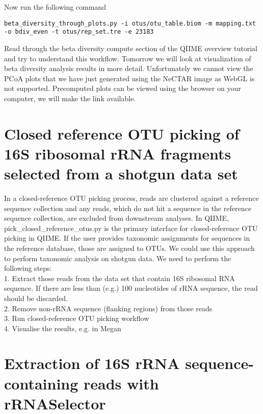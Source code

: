 \begin{steps}
Now run the following command
\begin{lstlisting}
beta_diversity_through_plots.py -i otus/otu_table.biom -m mapping.txt -o bdiv_even -t otus/rep_set.tre -e 23183

\end{lstlisting}
\end{steps}

Read through the beta diversity compute section of the QIIME overview tutorial and try to understand this workflow. Tomorrow we will look at visualization of beta diversity analysis results in more detail. Unfortunately we cannot view the PCoA plots that we have just generated using the NeCTAR image as WebGL is not supported. Precomputed plots can be viewed using the browser on your computer, we will make the link available.

\section{Closed reference OTU picking of 16S ribosomal rRNA fragments selected from a shotgun data set}

In a closed-reference OTU picking process, reads are clustered against a reference sequence collection and any reads, which do not hit a sequence in the reference sequence collection, are excluded from downstream analyses. In QIIME, pick\_closed\_reference\_otus.py is the primary interface for closed-reference OTU picking in QIIME. If the user provides taxonomic assignments for sequences in the reference database, those are assigned to OTUs. We could use this approach to perform taxonomic analysis on shotgun data. We need to perform the following steps:\\
1.	Extract those reads from the data set that contain 16S ribosomal RNA sequence. If there are less than (e.g.) 100 nucleotides of rRNA sequence, the read should be discarded.\\
2.	Remove non-rRNA sequence (flanking regions) from those reads\\
3.	Run closed-reference OTU picking workflow\\
4.	Visualise the results, e.g. in Megan\\

\section{Extraction of 16S rRNA sequence-containing reads with rRNASelector}

